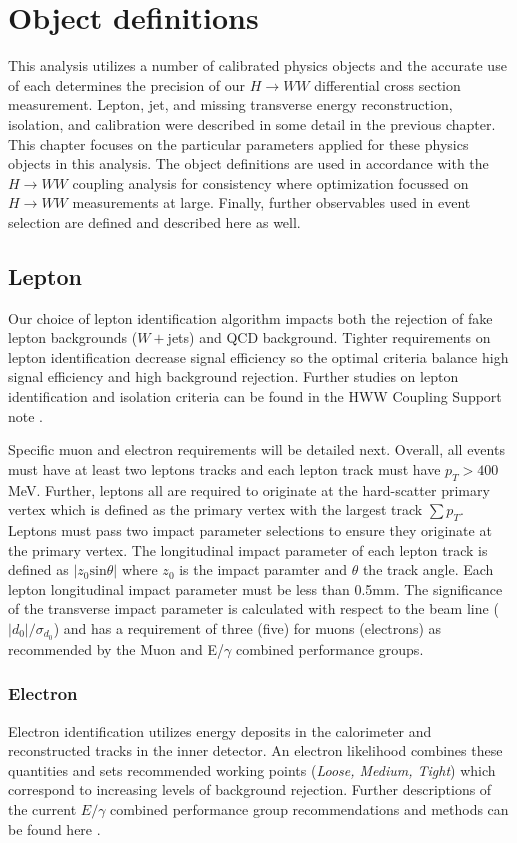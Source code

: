 \section{Object definitions}
This analysis utilizes a number of calibrated physics objects and the accurate use of each determines the precision of our $H\rightarrow WW$ differential cross section measurement. Lepton, jet, and missing transverse energy reconstruction, isolation, and calibration were described in some detail in the previous chapter. This chapter focuses on the particular parameters applied for these physics objects in this analysis. The object definitions are used in accordance with the $H\rightarrow WW$ coupling analysis for consistency where optimization focussed on $H \rightarrow WW$ measurements at large. Finally, further observables used in event selection are defined and described here as well. 

\subsection{Lepton}

Our choice of lepton identification algorithm impacts both the rejection of fake lepton backgrounds ($W+$jets) and QCD background. Tighter requirements on lepton identification decrease signal efficiency so the optimal criteria balance high signal efficiency and high background rejection. Further studies on lepton identification and isolation criteria can be found in the HWW Coupling Support note \cite{HWWCoupling}.

Specific muon and electron requirements will be detailed next. Overall, all events must have at least two leptons tracks and each lepton track must have $p_T>400$MeV. Further, leptons all are required to originate at the hard-scatter primary vertex which is defined as the primary vertex with the largest track $\sum p_T$. Leptons must pass two impact parameter selections to ensure they originate at the primary vertex. The longitudinal impact parameter of each lepton track is defined as $|z_0\mathrm{sin}\theta|$ where $z_0$ is the impact paramter and $\theta$ the track angle. Each lepton longitudinal impact parameter must be less than 0.5mm. The significance of the transverse impact parameter is calculated with respect to the beam line ($|d_0|/\sigma_{d_0}$) and has a requirement of three (five) for muons (electrons) as recommended by the Muon and E/$\gamma$ combined performance groups. 

\subsubsection{Electron}
Electron identification utilizes energy deposits in the calorimeter and reconstructed tracks in the inner detector. An electron likelihood combines these quantities and sets recommended working points (\textit{Loose, Medium, Tight}) which correspond to increasing levels of background rejection. Further descriptions of the current $E/\gamma$ combined performance group recommendations and methods can be found here \cite{ATL-PHYS-PUB-2015-041}.


